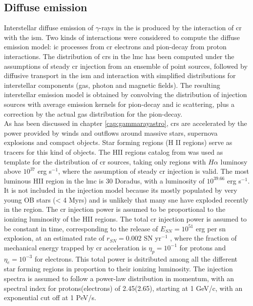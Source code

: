 \documentclass[main.tex]{subfiles}
\begin{document}
\subsection{Diffuse emission}
Interstellar diffuse emission of $\gamma$-rays in the  is produced by the interaction of \gls{cr} with the \gls{ism}. Two kinds of interactions were considered to compute the diffuse emission model: \gls{ic} processes from \gls{cr} electrons and pion-decay from proton interactions. The distribution of \glspl{cr} in the \gls{lmc} has been computed under the assumptions of steady \gls{cr} injection from an ensemble of point sources, followed by diffusive transport in the \gls{ism} and interaction with simplified distributions for interstellar components (gas, photon and magnetic fields). The resulting interstellar emission model is obtained by convolving the distribution of injection sources with average emission kernels for pion-decay and \gls{ic} scattering, plus a correction by the actual gas distribution for the pion-decay.\\
As has been discussed in chapter \ref{cap:gammarayastro}, \glspl{cr} are accelerated by the power provided by winds and outflows around massive stars, supernova explosions and compact objects. Star forming regions (H II regions) serve as tracers for this kind of objects. The HII regions catalog from \cite{2012HIIinLMC} was used as template for the distribution of \gls{cr} sources, taking only regions with $H\alpha$ luminosy above $10^{37}$ erg s$^{-1}$, where the assumption of steady \gls{cr} injection is valid. The most luminous HII region in the \gls{lmc} is 30 Doradus, with a luminosity of $10^{39.66}$ erg s$^{-1}$. It is not included in the injection model because its mostly populated by very young OB stars (< 4 Myrs) \cite{201130Doradusstarforming} and is unlikely that many \gls{sne} have exploded recently in the region. The \gls{cr} injection power is assumed to be proportional to the ionizing luminosity of the HII regions. The total \gls{cr} injection power is assumed to be constant in time, corresponding to the release of $E_{SN} = 10^{51}$ erg per \gls{sn} explosion, at an estimated rate of $r_{SN} =  0.002$ SN yr$^{-1}$ \cite{1991SNrates}, where the fraction of mechanical energy trapped by \gls{cr} acceleration is $\eta_{p} = 10^{-1}$ for protons and $\eta_{e} = 10^{-3}$ for electrons. This total power is dsitributed among all the different star forming regions in proportion to their ionizing luminosity.
The injection spectra is assumed to follow a power-law distribution in momentum, with an spectral index for protons(electrons) of 2.45(2.65), starting at 1 GeV/c, with an exponential cut off at 1 PeV/s.\\
\end{document}
